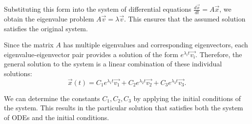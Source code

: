 \documentclass[12pt,a4paper]{article}
\begin{document}
\begin{solution}
\begin{remark}
Substituting this form into the system of differential equations $\frac{d \Vec{x}}{dt} = A \Vec{x}$, we obtain the eigenvalue problem $A \Vec{v} = \lambda \Vec{v}$. This ensures that the assumed solution satisfies the original system.

Since the matrix $A$ has multiple eigenvalues and corresponding eigenvectors, each eigenvalue-eigenvector pair provides a solution of the form $e^{\lambda_i t} \Vec{v_i}$. Therefore, the general solution to the system is a linear combination of these individual solutions:
\[
\Vec{x}(t) = C_1 e^{\lambda_1 t} \Vec{v_1} + C_2 e^{\lambda_2 t} \Vec{v_2} + C_3 e^{\lambda_3 t} \Vec{v_3}.
\]

We can determine the constants $C_1, C_2, C_3$ by applying the initial conditions of the system. This results in the particular solution that satisfies both the system of ODEs and the initial conditions.
\end{remark}
\end{solution}
\end{document}
